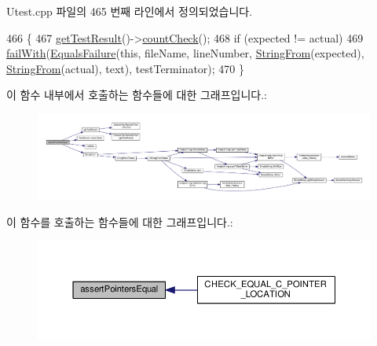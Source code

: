 Utest.\+cpp 파일의 465 번째 라인에서 정의되었습니다.


\begin{DoxyCode}
466 \{
467     \hyperlink{class_utest_shell_a34c525b685e30431750d9e355fdfff0c}{getTestResult}()->\hyperlink{class_test_result_a58577489a2418efb4c440761e533f2e7}{countCheck}();
468     \textcolor{keywordflow}{if} (expected != actual)
469         \hyperlink{class_utest_shell_ad50ae28f5ad9f1d224832cb1f89365a7}{failWith}(\hyperlink{class_equals_failure}{EqualsFailure}(\textcolor{keyword}{this}, fileName, lineNumber, 
      \hyperlink{_simple_string_8h_a195ee4ca8d909f9ebf37e963d4564446}{StringFrom}(expected), \hyperlink{_simple_string_8h_a195ee4ca8d909f9ebf37e963d4564446}{StringFrom}(actual), text), testTerminator);
470 \}
\end{DoxyCode}


이 함수 내부에서 호출하는 함수들에 대한 그래프입니다.\+:
\nopagebreak
\begin{figure}[H]
\begin{center}
\leavevmode
\includegraphics[width=350pt]{class_utest_shell_a511e5e49c21105966eee9f600a342455_cgraph}
\end{center}
\end{figure}




이 함수를 호출하는 함수들에 대한 그래프입니다.\+:
\nopagebreak
\begin{figure}[H]
\begin{center}
\leavevmode
\includegraphics[width=350pt]{class_utest_shell_a511e5e49c21105966eee9f600a342455_icgraph}
\end{center}
\end{figure}


